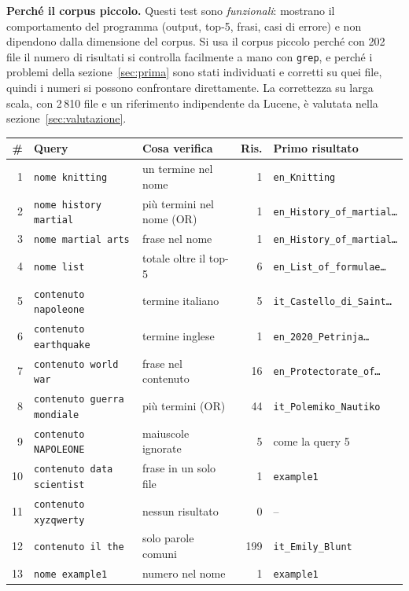 \documentclass[11pt,a4paper]{article}
\newcommand{\dq}{\textquotedbl}            %
\newcommand{\code}[1]{\texttt{#1}}
\begin{document}
\textbf{Perché il corpus piccolo.} Questi test sono \emph{funzionali}: mostrano il
comportamento del programma (output, top-5, frasi, casi di errore) e non dipendono
dalla dimensione del corpus. Si usa il corpus piccolo perché con 202 file il numero
di risultati si controlla facilmente a mano con \code{grep}, e perché i problemi
della sezione~\ref{sec:prima} sono stati individuati e corretti su quei file, quindi i
numeri si possono confrontare direttamente. La correttezza su larga scala, con 2\,810
file e un riferimento indipendente da Lucene, è valutata nella
sezione~\ref{sec:valutazione}.

\begin{table}[!htbp]
\centering
\small
\begin{tabularx}{\linewidth}{@{}rlXrl@{}}
\toprule
\textbf{\#} & \textbf{Query} & \textbf{Cosa verifica} & \textbf{Ris.} &
\textbf{Primo risultato} \\
\midrule
1  & \code{nome knitting} & un termine nel nome & 1 & \code{en\_Knitting} \\
2  & \code{nome history martial} & più termini nel nome (OR) & 1 & \code{en\_History\_of\_martial\ldots} \\
3  & \code{nome \dq{}martial arts\dq} & frase nel nome & 1 & \code{en\_History\_of\_martial\ldots} \\
4  & \code{nome list} & totale oltre il top-5 & 6 & \code{en\_List\_of\_formulae\ldots} \\
5  & \code{contenuto napoleone} & termine italiano & 5 & \code{it\_Castello\_di\_Saint\ldots} \\
6  & \code{contenuto earthquake} & termine inglese & 1 & \code{en\_2020\_Petrinja\ldots} \\
7  & \code{contenuto \dq{}world war\dq} & frase nel contenuto & 16 & \code{en\_Protectorate\_of\ldots} \\
8  & \code{contenuto guerra mondiale} & più termini (OR) & 44 & \code{it\_Polemiko\_Nautiko} \\
9  & \code{contenuto NAPOLEONE} & maiuscole ignorate & 5 & come la query 5 \\
10 & \code{contenuto \dq{}data scientist\dq} & frase in un solo file & 1 & \code{example1} \\
11 & \code{contenuto xyzqwerty} & nessun risultato & 0 & -- \\
12 & \code{contenuto il the} & solo parole comuni & 199 & \code{it\_Emily\_Blunt} \\
13 & \code{nome example1} & numero nel nome & 1 & \code{example1} \\

\end{tabularx}
\end{table}
\end{document}
